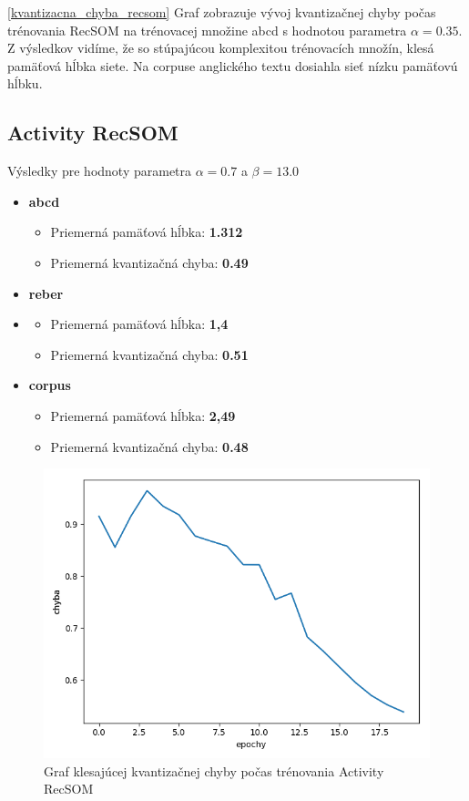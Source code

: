 \ref{kvantizacna_chyba_recsom} Graf zobrazuje vývoj kvantizačnej chyby počas trénovania RecSOM
na trénovacej množine abcd s hodnotou parametra $\alpha = 0.35$.
Z výsledkov vidíme, že so stúpajúcou komplexitou trénovacích množín, klesá pamäťová hĺbka siete.
Na corpuse anglického textu dosiahla sieť nízku pamäťovú hĺbku.

\subsection{Activity RecSOM}
Výsledky pre hodnoty parametra $\alpha = 0.7$ a $\beta = 13.0$
\begin{itemize}
    \item \textbf{abcd}
    \begin{itemize}
        \item Priemerná pamäťová hĺbka: \textbf{1.312}
        \item Priemerná kvantizačná chyba: \textbf{0.49}
    \end{itemize}
    \item \textbf{reber}
    \item \begin{itemize}
        \item Priemerná pamäťová hĺbka: \textbf{1,4}
        \item Priemerná kvantizačná chyba: \textbf{0.51}
    \end{itemize}
    \item \textbf{corpus}
    \begin{itemize}
        \item Priemerná pamäťová hĺbka: \textbf{2,49}
        \item Priemerná kvantizačná chyba: \textbf{0.48}
    \end{itemize}
\end{itemize}

\begin{figure}[H]
    \centering
    \includegraphics[width=\textwidth]{assets/ra_error_top}
    \caption{Graf klesajúcej kvantizačnej chyby počas trénovania Activity RecSOM}
\end{figure}

